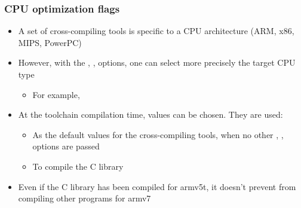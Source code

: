 \begin{frame}
  \frametitle{CPU optimization flags}
  \begin{itemize}
  \item A set of cross-compiling tools is specific to a CPU architecture (ARM,
    x86, MIPS, PowerPC)
  \item However, with the , ,
     options, one can select more precisely the
    target CPU type
    \begin{itemize}
    \item For example, 
    \end{itemize}
  \item At the toolchain compilation time, values can be chosen. They are used:
    \begin{itemize}
    \item As the default values for the cross-compiling tools, when no
      other , ,  options are
      passed
    \item To compile the C library
    \end{itemize}
  \item Even if the C library has been compiled for armv5t, it doesn't
    prevent from compiling other programs for armv7
  \end{itemize}
\end{frame}
